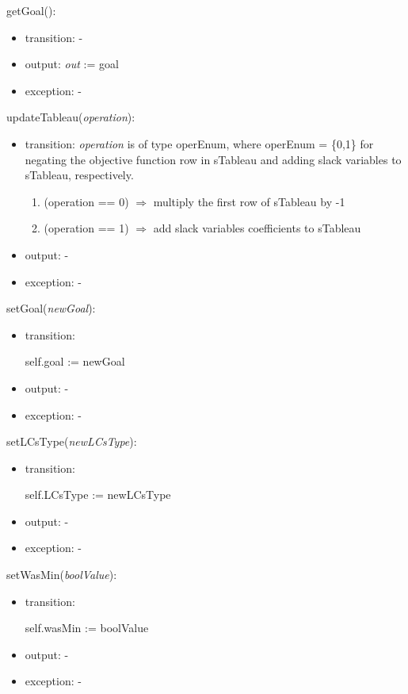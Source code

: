 \documentclass[12pt, titlepage]{article}
\begin{document}
\noindent 
getGoal():
\begin{itemize}
	\item transition: -
	\item output: \textit{out} := goal
	\item exception: -
\end{itemize}

\noindent 
updateTableau(\textit{operation}):
\begin{itemize}
	\item transition: \textit{operation} is of type operEnum, where operEnum = 
	\{0,1\} for negating the objective function row in sTableau and adding 
	slack variables to sTableau, respectively.
	\begin{enumerate}
		\item (operation == 0)  \hspace{3cm} $\Rightarrow$ multiply the first 
		row of sTableau by -1
		\item (operation == 1) \hspace{3cm} $\Rightarrow$ add slack variables 
		coefficients to sTableau
	\end{enumerate}
	\item output: -
	\item exception: -
\end{itemize}

\noindent 
setGoal(\textit{newGoal}):
\begin{itemize}
	\item transition: 
	
	self.goal := newGoal
	\item output: -
	\item exception: -
\end{itemize}

\noindent 
setLCsType(\textit{newLCsType}):
\begin{itemize}
	\item transition: 
	
	self.LCsType := newLCsType
	\item output: -
	\item exception: -
\end{itemize}

\noindent 
setWasMin(\textit{boolValue}):
\begin{itemize}
	\item transition: 
	
	self.wasMin := boolValue
	\item output: -
	\item exception: -
\end{itemize}
\end{document}
